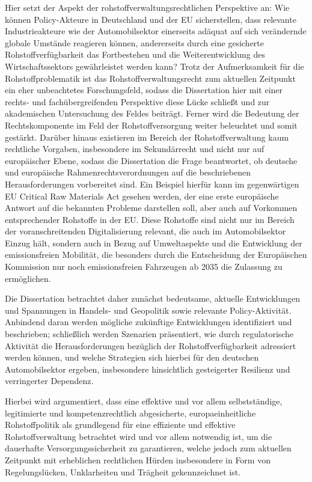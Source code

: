 \documentclass[12pt,a4paper,oneside]{book} %
\begin{document}
	Hier setzt der Aspekt der rohstoffverwaltungsrechtlichen Perspektive an: Wie können Policy-Akteure in Deutschland und der EU sicherstellen, dass relevante Industrieakteure wie der Automobilsektor einerseits adäquat auf sich verändernde globale Umstände reagieren können, andererseits durch eine gesicherte Rohstoffverfügbarkeit das Fortbestehen und die Weiterentwicklung des Wirtschaftssektors gewährleistet werden kann? Trotz der Aufmerksamkeit für die Rohstoffproblematik ist das Rohstoffverwaltungsrecht zum aktuellen Zeitpunkt ein eher unbeachtetes Forschungsfeld, sodass die Dissertation hier mit einer rechts- und fachübergreifenden Perspektive diese Lücke schließt und zur akademischen Untersuchung des Feldes beiträgt. Ferner wird die Bedeutung der Rechtskomponente im Feld der Rohstoffversorgung weiter beleuchtet und somit gestärkt. Darüber hinaus existieren im Bereich der Rohstoffverwaltung kaum rechtliche Vorgaben, insbesondere im Sekundärrecht und nicht nur auf europäischer Ebene, sodass die Dissertation die Frage beantwortet, ob deutsche und europäische Rahmenrechtsverordnungen auf die beschriebenen Herausforderungen vorbereitet sind. Ein Beispiel hierfür kann im gegenwärtigen EU Critical Raw Materials Act gesehen werden, der eine erste europäische Antwort auf die bekannten Probleme darstellen soll, aber auch auf Vorkommen entsprechender Rohstoffe in der EU. Diese Rohstoffe sind nicht nur im Bereich der voranschreitenden Digitalisierung relevant, die auch im Automobilsektor Einzug hält, sondern auch in Bezug auf Umweltaspekte und die Entwicklung der emissionsfreien Mobilität, die besonders durch die Entscheidung der Europäischen Kommission nur noch emissionsfreien Fahrzeugen ab 2035 die Zulassung zu ermöglichen.
	
	Die Dissertation betrachtet daher zunächst bedeutsame, aktuelle Entwicklungen und Spannungen in Handels- und Geopolitik sowie relevante Policy-Aktivität. Anbindend daran werden mögliche zukünftige Entwicklungen identifiziert und beschrieben; schließlich werden Szenarien präsentiert, wie durch regulatorische Aktivität die Herausforderungen bezüglich der Rohstoffverfügbarkeit adressiert werden können, und welche Strategien sich hierbei für den deutschen Automobilsektor ergeben, insbesondere hinsichtlich gesteigerter Resilienz und verringerter Dependenz. 
	
	Hierbei wird argumentiert, dass eine effektive und vor allem selbstständige, legitimierte und kompetenzrechtlich abgesicherte, europaeinheitliche Rohstoffpolitik als grundlegend für eine effiziente und effektive Rohstoffverwaltung betrachtet wird und vor allem notwendig ist, um die dauerhafte Versorgungssicherheit zu garantieren, welche jedoch zum aktuellen Zeitpunkt mit erheblichen rechtlichen Hürden insbesondere in Form von Regelungslücken, Unklarheiten und Trägheit gekennzeichnet ist.
	
\end{document}

